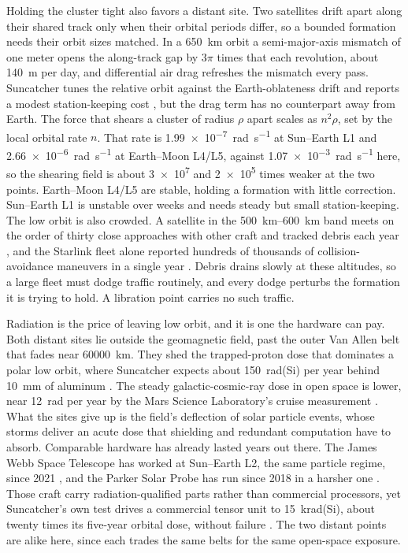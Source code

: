 \documentclass{article}
\begin{document}
Holding the cluster tight also favors a distant site. Two satellites drift apart along their shared track only when their orbital periods differ, so a bounded formation needs their orbit sizes matched. In a \SI{650}{\kilo\meter} orbit a semi-major-axis mismatch of one meter opens the along-track gap by $3\pi$ times that each revolution, about \SI{140}{\meter} per day, and differential air drag refreshes the mismatch every pass. Suncatcher tunes the relative orbit against the Earth-oblateness drift and reports a modest station-keeping cost \cite{aguera2026_suncatcher}, but the drag term has no counterpart away from Earth. The force that shears a cluster of radius $\rho$ apart scales as $n^2\rho$, set by the local orbital rate $n$. That rate is \SI{1.99e-7}{\radian\per\second} at Sun--Earth L1 and \SI{2.66e-6}{\radian\per\second} at Earth--Moon L4/L5, against \SI{1.07e-3}{\radian\per\second} here, so the shearing field is about \num{3e7} and \num{2e5} times weaker at the two points. Earth--Moon L4/L5 are stable, holding a formation with little correction. Sun--Earth L1 is unstable over weeks and needs steady but small station-keeping. The low orbit is also crowded. A satellite in the \SIrange{500}{600}{\kilo\meter} band meets on the order of thirty close approaches with other craft and tracked debris each year \cite{esa_space_environment_2024}, and the Starlink fleet alone reported hundreds of thousands of collision-avoidance maneuvers in a single year \cite{spacex_conjunction_2025}. Debris drains slowly at these altitudes, so a large fleet must dodge traffic routinely, and every dodge perturbs the formation it is trying to hold. A libration point carries no such traffic.

Radiation is the price of leaving low orbit, and it is one the hardware can pay. Both distant sites lie outside the geomagnetic field, past the outer Van Allen belt that fades near \SI{60000}{\kilo\meter}. They shed the trapped-proton dose that dominates a polar low orbit, where Suncatcher expects about 150~rad(Si) per year behind \SI{10}{\milli\meter} of aluminum \cite{aguera2026_suncatcher}. The steady galactic-cosmic-ray dose in open space is lower, near 12~rad per year by the Mars Science Laboratory's cruise measurement \cite{zeitlin2013_msl_rad}. What the sites give up is the field's deflection of solar particle events, whose storms deliver an acute dose that shielding and redundant computation have to absorb. Comparable hardware has already lasted years out there. The James Webb Space Telescope has worked at Sun--Earth L2, the same particle regime, since 2021 \cite{gardner2023jwst_mission}, and the Parker Solar Probe has run since 2018 in a harsher one \cite{nasa2024_parker_survives}. Those craft carry radiation-qualified parts rather than commercial processors, yet Suncatcher's own test drives a commercial tensor unit to 15~krad(Si), about twenty times its five-year orbital dose, without failure \cite{aguera2026_suncatcher}. The two distant points are alike here, since each trades the same belts for the same open-space exposure.
\end{document}
